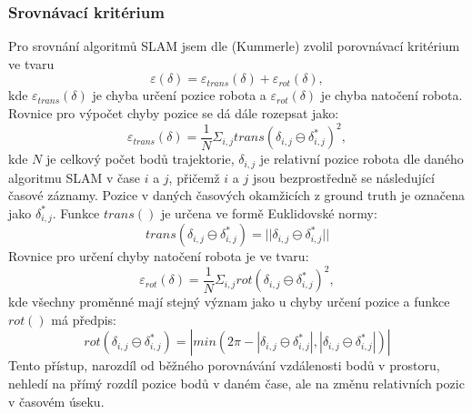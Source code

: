 \documentclass[12pt]{article}
\begin{document}
\subsubsection{Srovnávací kritérium}
Pro srovnání algoritmů SLAM jsem dle (Kummerle) zvolil porovnávací kritérium ve tvaru
\begin{equation}
	\varepsilon(\delta)=\varepsilon_{trans}(\delta)+\varepsilon_{rot}(\delta),
\end{equation}
kde $\varepsilon_{trans}(\delta)$ je chyba určení pozice robota a $\varepsilon_{rot}(\delta)$ je chyba natočení robota.\\
\indent Rovnice pro výpočet chyby pozice se dá dále rozepsat jako:
\begin{equation}
	\varepsilon_{trans}(\delta)=\frac{1}{N}\Sigma_{i,j}trans(\delta_{i,j}\ominus\delta^*_{i,j})^2,
\end{equation}
kde $N$ je celkový počet bodů trajektorie, $\delta_{i,j}$ je relativní pozice robota dle daného algoritmu SLAM v čase $i$ a $j$, přičemž $i$ a $j$ jsou bezprostředně se následující časové záznamy. Pozice v daných časových okamžicích z ground truth je označena jako $\delta^*_{i,j}$. Funkce $trans()$ je určena ve formě Euklidovské normy:
\begin{equation}
	trans(\delta_{i,j}\ominus\delta^*_{i,j})=||\delta_{i,j}\ominus\delta^*_{i,j}||
\end{equation}  
Rovnice pro určení chyby natočení robota je ve tvaru:
\begin{equation}
	\varepsilon_{rot}(\delta)=\frac{1}{N}\Sigma_{i,j}rot(\delta_{i,j}\ominus\delta^*_{i,j})^2,
\end{equation}
kde všechny proměnné mají stejný význam jako u chyby určení pozice a funkce $rot()$ má předpis:
\begin{equation}
	rot(\delta_{i,j}\ominus\delta^*_{i,j})=|min(2\pi-|\delta_{i,j}\ominus\delta^*_{i,j}|,|\delta_{i,j}\ominus\delta^*_{i,j}|)|
\end{equation}
Tento přístup, narozdíl od běžného porovnávání vzdálenosti bodů v prostoru, nehledí na přímý rozdíl pozice bodů v daném čase, ale na změnu relativních pozic v časovém úseku. 

\newpage
\end{document}
